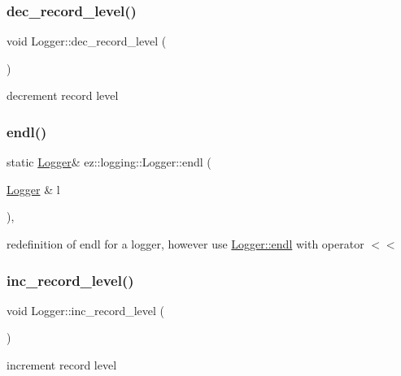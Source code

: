 \subsubsection{\texorpdfstring{dec\+\_\+record\+\_\+level()}{dec\_record\_level()}}
{\footnotesize\ttfamily void Logger\+::dec\+\_\+record\+\_\+level (\begin{DoxyParamCaption}{ }\end{DoxyParamCaption})}

decrement record level \mbox{\label{classez_1_1logging_1_1Logger_a69ba6cf7130aa70caeca9f5c8636e05a}} 
\subsubsection{\texorpdfstring{endl()}{endl()}}
{\footnotesize\ttfamily static \hyperlink{classez_1_1logging_1_1Logger}{Logger}\& ez\+::logging\+::\+Logger\+::endl (\begin{DoxyParamCaption}\item[{\hyperlink{classez_1_1logging_1_1Logger}{Logger} \&}]{l }\end{DoxyParamCaption})\hspace{0.3cm}{\ttfamily [inline]}, {\ttfamily [static]}}

redefinition of endl for a logger, however use \hyperlink{classez_1_1logging_1_1Logger_a69ba6cf7130aa70caeca9f5c8636e05a}{Logger\+::endl} with operator $<$$<$ \mbox{\label{classez_1_1logging_1_1Logger_a9f9bf63329c39c8f9fb116faba1a9b1e}} 
\subsubsection{\texorpdfstring{inc\+\_\+record\+\_\+level()}{inc\_record\_level()}}
{\footnotesize\ttfamily void Logger\+::inc\+\_\+record\+\_\+level (\begin{DoxyParamCaption}{ }\end{DoxyParamCaption})}

increment record level \mbox{\label{classez_1_1logging_1_1Logger_a439b87c1fdbfe851afcb3cfb29534437}} 
